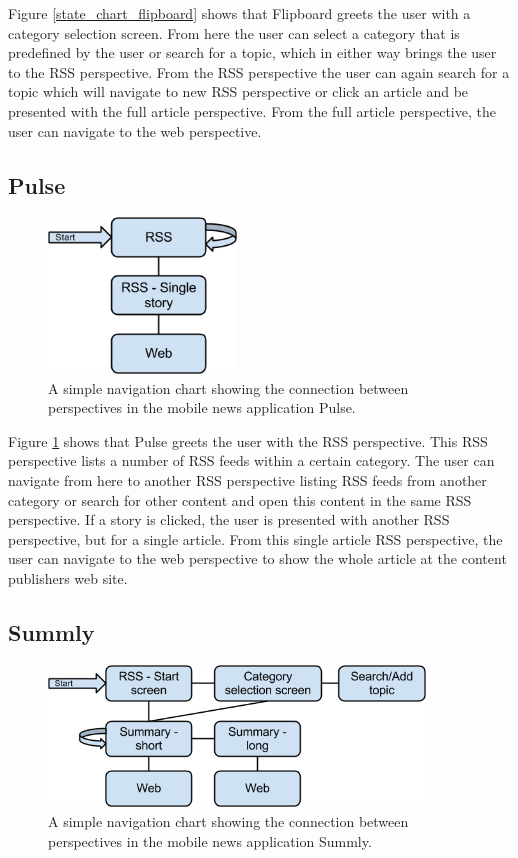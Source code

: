 Figure \ref{state_chart_flipboard} shows that Flipboard greets the user with a category selection screen. From here the user can select a category that is predefined by the user or search for a topic, which in either way brings the user to the RSS perspective. From the RSS perspective the user can again search for a topic which will navigate to new RSS perspective or click an article and be presented with the full article perspective. From the full article perspective, the user can navigate to the web perspective.

\subsection{Pulse}

\begin{figure}[!htbp]
\centering
\includegraphics[width=50mm]{GFX/statecharts/Pulse.png}
\caption{A simple navigation chart showing the connection between perspectives in the mobile news application Pulse.}
\label{state_chart_pulse}
\end{figure}

Figure \ref{state_chart_pulse} shows that Pulse greets the user with the RSS perspective. This RSS perspective lists a number of RSS feeds within a certain category. The user can navigate from here to another RSS perspective listing RSS feeds from another category or search for other content and open this content in the same RSS perspective. If a story is clicked, the user is presented with another RSS perspective, but for a single article. From this single article RSS perspective, the user can navigate to the web perspective to show the whole article at the content publishers web site. 

\subsection{Summly}

\begin{figure}[!htbp]
\centering
\includegraphics[width=100mm]{GFX/statecharts/Summly.png}
\caption{A simple navigation chart showing the connection between perspectives in the mobile news application Summly.}
\label{state_chart_summly}
\end{figure}

